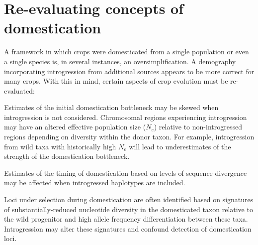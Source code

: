 \documentclass[11pt]{article}
\newcommand{\lwang}[1]{\textcolor{red}{ \emph{\scriptsize  #1}} } %
\newcommand{\gmj}[1]{\textcolor{blue}{ \emph{\scriptsize  #1}} } %
\begin{document}
\section*{Re-evaluating concepts of domestication}
A framework in which crops were domesticated from a single population or even a single species is, in several instances, an oversimplification.
A demography incorporating introgression from additional sources appears to be more correct for many crops.
With this in mind, certain aspects of crop evolution must be re-evaluated:

Estimates of the initial domestication bottleneck may be skewed when introgression is not considered.
Chromosomal regions experiencing introgression may have an altered effective population size ($N_e$) relative to non-introgressed regions depending on diversity within the donor taxon.
For example, introgression from wild taxa with historically high $N_e$ will lead to underestimates of the strength of the domestication bottleneck.


Estimates of the timing of domestication based on levels of sequence divergence may be affected when introgressed haplotypes are included.


Loci under selection during domestication are often identified based on signatures of substantially-reduced nucleotide diversity in the domesticated taxon relative to the wild progenitor and high allele frequency differentiation between these taxa.
Introgression may alter these signatures and confound detection of domestication loci.
\end{document}
